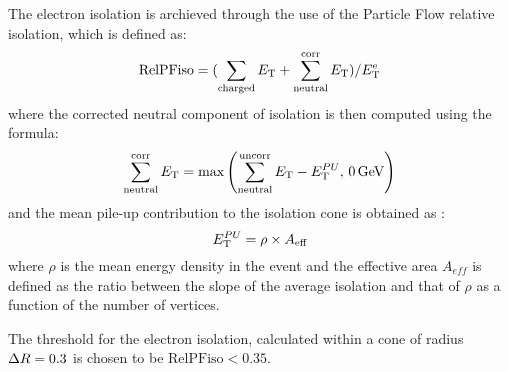 The electron isolation is archieved through the use of the Particle Flow relative isolation,
which is defined as:
\begin{equation}
\text{RelPFiso} = (\sum_{\text{charged}} E_{\mathrm{T}} + \sum^{\text{corr}}_{\text{neutral}} E_{\mathrm{T}})/E_{\mathrm{T}}^{\text{e}}
\label{eqn:elepfrelisoeqn}
\end{equation} 
where the corrected neutral component of isolation is then computed using the formula:
\begin{equation}
\label{eqn:neutralea}
  \sum^{\text{corr}}_{\text{neutral}} E_{\mathrm{T}} = \text{max} \left( \sum^{\text{uncorr}}_{\text{neutral}} E_{\mathrm{T}} - E_{\mathrm{T}}^{PU},\, 0 \,\text{Ge\hspace{-.08em}V} \right)
\end{equation}
and the mean pile-up contribution to the isolation cone is obtained as :
\begin{equation}
  E_{\mathrm{T}}^{PU} =  \rho \times A_\text{eff}
\label{eqn:purho}
\end{equation}
where $\rho$ is the mean energy density in the event and the effective area $A_{eff}$ is defined as the ratio
between the slope of the average isolation and that of $\rho$ as a function of the number of vertices.

The threshold for the electron isolation,
calculated within a cone of radius $\Delta R = 0.3$
is chosen to be $\text{RelPFiso} < 0.35$. 
